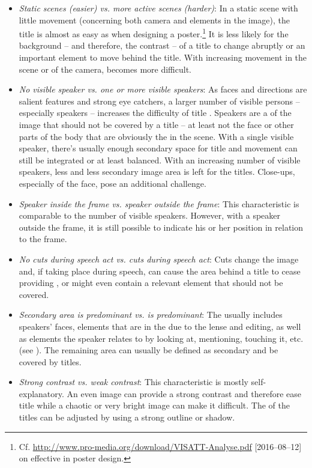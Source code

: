 \begin{itemize}
\item \textit{Static scenes (easier) vs. more active scenes (harder)}: In a static scene with little movement (concerning both camera and elements in the image), the title  is almost as easy as when designing a poster.\footnote{Cf. \url{http://www.pro-media.org/download/VISATT-Analyse.pdf} [2016--08--12] on effective  in poster design.} It is less likely for the background – and therefore, the contrast – of a title to change abruptly or an important element to move behind the title. With increasing movement in the scene or of the camera,  becomes more difficult.
\item \textit{No visible speaker vs. one or more visible speakers}: As faces and  directions are salient features and strong eye catchers, a larger number of visible persons – especially speakers – increases the difficulty of title . Speakers are a  of the image that should not be covered by a title – at least not the face or other parts of the body that are obviously the  in the scene. With a single visible speaker, there’s usually enough secondary space for title  and movement can still be integrated or at least balanced. With an increasing number of visible speakers, less and less secondary image area is left for the titles. Close-ups, especially of the face, pose an additional challenge.
\item \textit{Speaker inside the frame vs. speaker outside the frame}: This characteristic is comparable to the number of visible speakers. However, with a speaker outside the frame, it is still possible to indicate his or her position in relation to the frame.
\item \textit{No cuts during speech act vs. cuts during speech act}: Cuts change the image and, if taking place during speech, can cause the area behind a title to cease providing , or might even contain a relevant element that should not be covered.
\item \textit{Secondary area is predominant vs.  is predominant}: The  usually includes speakers’ faces, elements that are in the  due to the lense and editing, as well as elements the speaker relates to by looking at, mentioning, touching it, etc. (see ). The remaining area can usually be defined as secondary and be covered by titles.
\item \textit{Strong contrast vs. weak contrast}: This characteristic is mostly self-explan\-a\-to\-ry. An even image can provide a strong contrast and therefore ease title  while a chaotic or very bright image can make it difficult. The  of the titles can be adjusted by using a strong outline or shadow.
\end{itemize}

